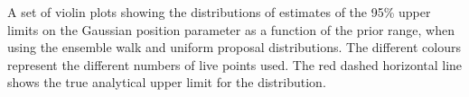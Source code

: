 \label{fig:walkunipropuls}
A set of violin plots showing the distributions of estimates of the 95\% upper limits on the Gaussian position parameter as a function of the prior range, when using the ensemble walk and uniform proposal distributions. The different colours represent the different numbers of live points  used. The red dashed horizontal line shows the true analytical upper limit for the distribution.
